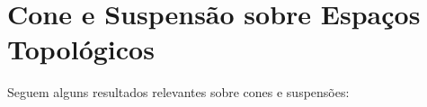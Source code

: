 \section{Cone e Suspensão sobre Espaços Topológicos}
\label{cone-suspensao}


Seguem alguns resultados relevantes sobre cones e suspensões:






